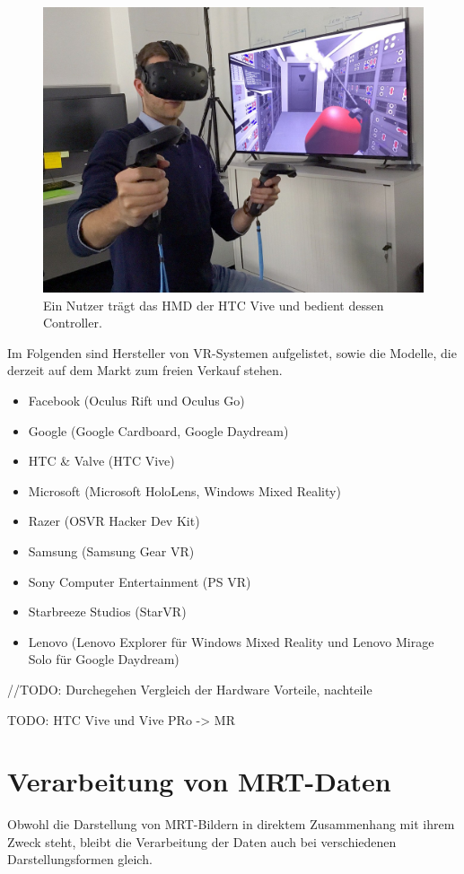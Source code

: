 \begin{figure}
	\centering
	\includegraphics[width=0.5\linewidth]{images/vive.jpg}
	\caption{Ein Nutzer trägt das HMD der HTC Vive und bedient dessen Controller.}
	\label{img:vive}
\end{figure}

  
Im Folgenden sind Hersteller von VR-Systemen aufgelistet, sowie die Modelle, die derzeit auf dem Markt zum freien Verkauf stehen.

\begin{itemize}
\item Facebook (Oculus Rift und Oculus Go)
\item Google (Google Cardboard, Google Daydream)
\item HTC \& Valve (HTC Vive)
\item Microsoft (Microsoft HoloLens, Windows Mixed Reality)
\item Razer (OSVR Hacker Dev Kit)
\item Samsung (Samsung Gear VR)
\item Sony Computer Entertainment (PS VR)
\item Starbreeze Studios (StarVR)
\item Lenovo (Lenovo Explorer für Windows Mixed Reality und Lenovo Mirage Solo für Google Daydream)
\end{itemize}

//TODO:
Durchegehen
Vergleich der Hardware Vorteile, nachteile

TODO: 
HTC Vive und Vive PRo -> MR
\section{Verarbeitung von MRT-Daten}						 %
Obwohl die Darstellung von MRT-Bildern in direktem Zusammenhang mit ihrem Zweck steht, bleibt die Verarbeitung der Daten auch bei verschiedenen Darstellungsformen gleich. 

